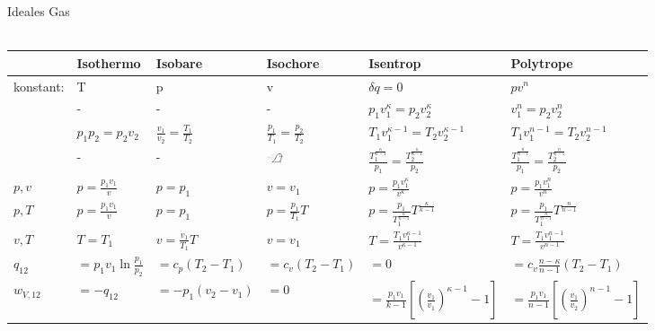 \documentclass[twocolumn]{article}
\begin{document}
\begin{landscape}
	\LARGE
	Ideales Gas 
	\\\\
	\renewcommand{\arraystretch}{2}
\begin{tabular}{l|l|l|l|l|l}
& Isothermo  
& Isobare  
& Isochore  
& Isentrop  
& Polytrope 
\\ \hline
  konstant:  
& T  
& p  
& v  
& $\delta q=0$  
& $pv^n$  
\\ \hline
	
& -  
& -  
& -  
& $p_1 v_1^{\kappa} = p_2 v_2^{\kappa}$  
& $v_1^{n} = p_2 v_2^{n}$  
\\ \hline

& $p_1 p_2 = p_2 v_2$  
& $\frac{v_1}{v_2} = \frac{T_1}{T_2}$  
& $\frac{p_1}{T_1} = \frac{p_2}{T_2}$  
& $T_1 v_1^{\kappa - 1} = T_2 v_2^{\kappa -1}$   
& $T_1 v_1^{n - 1} = T_2 v_2^{n -1}$  
\\ \hline
	
& -  
& -  
& $\small\xrightswishingghost{}$  
& $\frac{T_1^{\frac{\kappa}{\kappa -1}}}{p_1} = \frac{T_2^{\frac{\kappa}{\kappa -1}}}{p_2}$  
& $\frac{T_1^{\frac{n}{n -1}}}{p_1} = \frac{T_2^{\frac{n}{n -1}}}{p_2}$  
\\ \hline

	$p,v$

& $p = \frac{p_1 v_1}{v}$  
& $p = p_1$  
& $v = v_1$  
& $p = \frac{p_1 v_1^{\kappa}}{v^{\kappa}}$  
& $p = \frac{p_1 v_1^{n}}{v^{n}}$ 
\\ \hline

	$p,T$

& $p = \frac{p_1 v_1}{v}$  
& $p = p_1$  
& $p = \frac{p_1}{T_1}T$  
& $p = \frac{p_1}{T_1^{\frac{\kappa}{\kappa -1}}} T^{\frac{\kappa}{\kappa -1}}$  
& $p = \frac{p_1}{T_1^{\frac{n}{n -1}}} T^{\frac{n}{n -1}}$
\\ \hline

	$v,T$  

& $T = T_1$  
& $v = \frac{v_1}{T_1}T$  
& $v = v_1 $ 
& $T = \frac{T_1 v_1^{\kappa - 1}}{v^{\kappa - 1}}$  
& $T = \frac{T_1v_1^{n-1}}{v^{n-1}}  $
\\ \hline

	$q_{12}$	

& $= p_1v_1 \ln \frac{p_1}{p_2}$  
& $= c_p(T_2 - T_1)$   
& $= c_v(T_2 - T_1)$  
& $= 0$   
&  $= c_v \frac{n-\kappa}{n-1}(T_2-T_1)$ 
\\ \hline

	$w_{V,12}$  

& $= -q_{12}$ 
& $= -p_1(v_2 - v_1)$  
& $= 0$  
& $= \frac{p_1 v_1}{k - 1}\left[\left(\frac{v_1}{v_1}\right)^{\kappa - 1} - 1\right]$  
& $= \frac{p_1 v_1}{n - 1}\left[\left(\frac{v_1}{v_2}\right)^{n-1} - 1\right]$ 
\\ \hline


\end{tabular}
\end{landscape}
\end{document}

